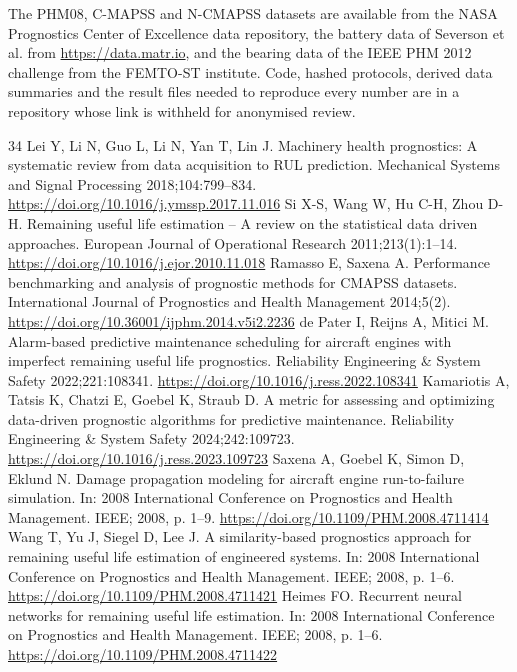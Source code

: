 \documentclass[a4paper,fleqn,doubleblind]{cas-dc}
\begin{document}
\noindent The PHM08, C-MAPSS and N-CMAPSS datasets are available from the NASA Prognostics Center of Excellence data repository, the battery data of Severson et al. \cite{severson2019} from \url{https://data.matr.io}, and the bearing data of the IEEE PHM 2012 challenge \cite{nectoux2012} from the FEMTO-ST institute. Code, hashed protocols, derived data summaries and the result files needed to reproduce every number are in a repository whose link is withheld for anonymised review.

\begin{thebibliography}{34}
 Lei Y, Li N, Guo L, Li N, Yan T, Lin J. Machinery health prognostics: A systematic review from data acquisition to RUL prediction. Mechanical Systems and Signal Processing 2018;104:799--834. \url{https://doi.org/10.1016/j.ymssp.2017.11.016}
 Si X-S, Wang W, Hu C-H, Zhou D-H. Remaining useful life estimation -- A review on the statistical data driven approaches. European Journal of Operational Research 2011;213(1):1--14. \url{https://doi.org/10.1016/j.ejor.2010.11.018}
 Ramasso E, Saxena A. Performance benchmarking and analysis of prognostic methods for CMAPSS datasets. International Journal of Prognostics and Health Management 2014;5(2). \url{https://doi.org/10.36001/ijphm.2014.v5i2.2236}
 de Pater I, Reijns A, Mitici M. Alarm-based predictive maintenance scheduling for aircraft engines with imperfect remaining useful life prognostics. Reliability Engineering \& System Safety 2022;221:108341. \url{https://doi.org/10.1016/j.ress.2022.108341}
 Kamariotis A, Tatsis K, Chatzi E, Goebel K, Straub D. A metric for assessing and optimizing data-driven prognostic algorithms for predictive maintenance. Reliability Engineering \& System Safety 2024;242:109723. \url{https://doi.org/10.1016/j.ress.2023.109723}
 Saxena A, Goebel K, Simon D, Eklund N. Damage propagation modeling for aircraft engine run-to-failure simulation. In: 2008 International Conference on Prognostics and Health Management. IEEE; 2008, p. 1--9. \url{https://doi.org/10.1109/PHM.2008.4711414}
 Wang T, Yu J, Siegel D, Lee J. A similarity-based prognostics approach for remaining useful life estimation of engineered systems. In: 2008 International Conference on Prognostics and Health Management. IEEE; 2008, p. 1--6. \url{https://doi.org/10.1109/PHM.2008.4711421}
 Heimes FO. Recurrent neural networks for remaining useful life estimation. In: 2008 International Conference on Prognostics and Health Management. IEEE; 2008, p. 1--6. \url{https://doi.org/10.1109/PHM.2008.4711422}

\end{thebibliography}
\end{document}
